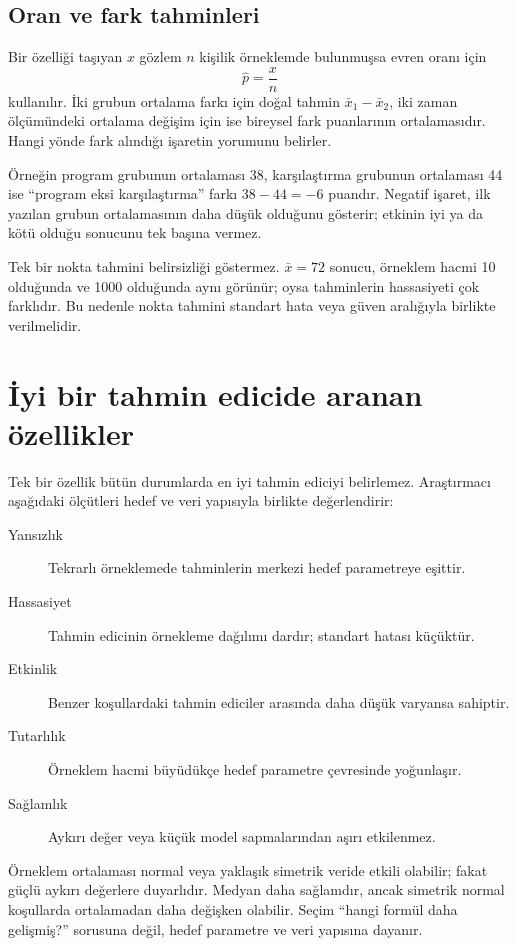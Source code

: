 \subsection{Oran ve fark tahminleri}

Bir özelliği taşıyan $x$ gözlem $n$ kişilik örneklemde bulunmuşsa evren oranı
için
\[
\hat p=\frac{x}{n}
\]
kullanılır. İki grubun ortalama farkı için doğal tahmin
$\bar x_1-\bar x_2$, iki zaman ölçümündeki ortalama değişim için ise bireysel
fark puanlarının ortalamasıdır. Hangi yönde fark alındığı işaretin yorumunu
belirler.

Örneğin program grubunun ortalaması 38, karşılaştırma grubunun ortalaması 44
ise ``program eksi karşılaştırma'' farkı $38-44=-6$ puandır. Negatif işaret,
ilk yazılan grubun ortalamasının daha düşük olduğunu gösterir; etkinin iyi ya
da kötü olduğu sonucunu tek başına vermez.

Tek bir nokta tahmini belirsizliği göstermez. $\bar x=72$ sonucu, örneklem
hacmi 10 olduğunda ve 1000 olduğunda aynı görünür; oysa tahminlerin hassasiyeti
çok farklıdır. Bu nedenle nokta tahmini standart hata veya güven aralığıyla
birlikte verilmelidir.

\section{İyi bir tahmin edicide aranan özellikler}

Tek bir özellik bütün durumlarda en iyi tahmin ediciyi belirlemez. Araştırmacı
aşağıdaki ölçütleri hedef ve veri yapısıyla birlikte değerlendirir:

\begin{description}
  \item[Yansızlık] Tekrarlı örneklemede tahminlerin merkezi hedef parametreye eşittir.
  \item[Hassasiyet] Tahmin edicinin örnekleme dağılımı dardır; standart hatası küçüktür.
  \item[Etkinlik] Benzer koşullardaki tahmin ediciler arasında daha düşük varyansa sahiptir.
  \item[Tutarlılık] Örneklem hacmi büyüdükçe hedef parametre çevresinde yoğunlaşır.
  \item[Sağlamlık] Aykırı değer veya küçük model sapmalarından aşırı etkilenmez.
\end{description}

Örneklem ortalaması normal veya yaklaşık simetrik veride etkili olabilir;
fakat güçlü aykırı değerlere duyarlıdır. Medyan daha sağlamdır, ancak simetrik
normal koşullarda ortalamadan daha değişken olabilir. Seçim ``hangi formül
daha gelişmiş?'' sorusuna değil, hedef parametre ve veri yapısına dayanır.

